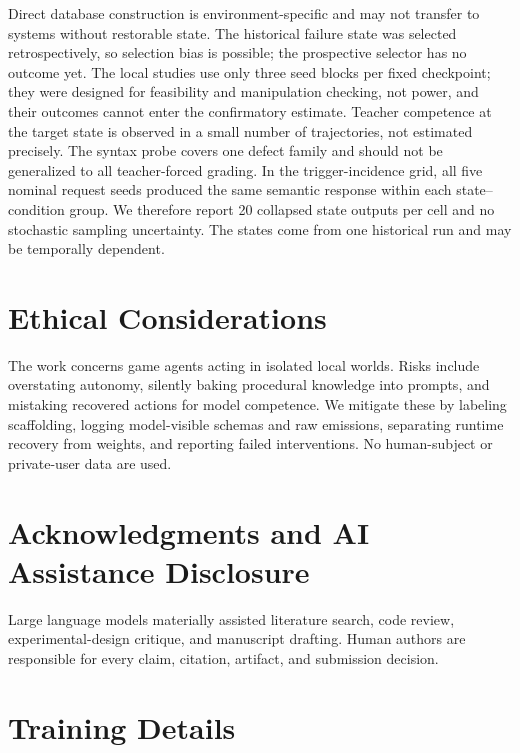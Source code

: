 \documentclass[11pt,a4paper]{article}
\begin{document}
Direct database construction is environment-specific and may not transfer to
systems without restorable state. The historical failure state was selected
retrospectively, so selection bias is possible; the prospective selector has no
outcome yet. The local studies use only three seed blocks per fixed checkpoint;
they were designed for feasibility and manipulation checking, not power, and
their outcomes cannot enter the confirmatory estimate. Teacher competence at the target state is observed in a small number
of trajectories, not estimated precisely.
The syntax probe covers one defect family and should not be generalized to all
teacher-forced grading.
In the trigger-incidence grid, all five nominal request seeds produced the same
semantic response within each state--condition group. We therefore report 20
collapsed state outputs per cell and no stochastic sampling uncertainty. The
states come from one historical run and may be temporally dependent.

\section*{Ethical Considerations}

The work concerns game agents acting in isolated local worlds. Risks include
overstating autonomy, silently baking procedural knowledge into prompts, and
mistaking recovered actions for model competence. We mitigate these by labeling
scaffolding, logging model-visible schemas and raw emissions, separating runtime
recovery from weights, and reporting failed interventions. No human-subject or
private-user data are used.

\makeatletter
\ifacl@finalcopy
  \section*{Acknowledgments and AI Assistance Disclosure}

  Large language models materially assisted literature search, code review,
  experimental-design critique, and manuscript drafting. Human authors are
  responsible for every claim, citation, artifact, and submission decision.
\fi
\makeatother



\appendix

\section{Training Details}
\label{app:training}
\end{document}
